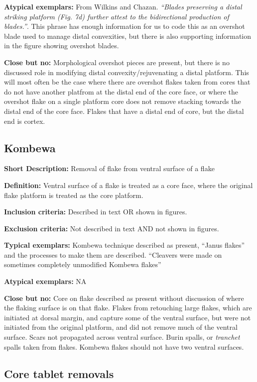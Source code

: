 \documentclass[
]{article}
\begin{document}
\textbf{Atypical exemplars:} From Wilkins and Chazan. \emph{``Blades
preserving a distal striking platform (Fig. 7d) further attest to the
bidirectional production of blades.''}. This phrase has enough
information for us to code this as an overshot blade used to manage
distal convexities, but there is also supporting information in the
figure showing overshot blades.

\textbf{Close but no:} Morphological overshot pieces are present, but
there is no discussed role in modifying distal convexity/rejuvenating a
distal platform. This will most often be the case where there are
overshot flakes taken from cores that do not have another platfrom at
the distal end of the core face, or where the overshot flake on a single
platform core does not remove stacking towards the distal end of the
core face. Flakes that have a distal end of core, but the distal end is
cortex.

\hypertarget{kombewa}{%
\subsection{Kombewa}\label{kombewa}}

\textbf{Short Description:} Removal of flake from ventral surface of a
flake

\textbf{Definition:} Ventral surface of a flake is treated as a core
face, where the original flake platform is treated as the core platform.

\textbf{Inclusion criteria:} Described in text OR shown in figures.

\textbf{Exclusion criteria:} Not described in text AND not shown in
figures.

\textbf{Typical exemplars:} Kombewa technique described as present,
``Janus flakes'' and the processes to make them are described.
``Cleavers were made on sometimes completely unmodified Kombewa flakes''

\textbf{Atypical exemplars:} NA

\textbf{Close but no:} Core on flake described as present without
discussion of where the flaking surface is on that flake. Flakes from
retouching large flakes, which are initiated at dorsal margin, and
capture some of the ventral surface, but were not initiated from the
original platform, and did not remove much of the ventral surface. Scars
not propagated across ventral surface. Burin spalls, or \emph{tranchet}
spalls taken from flakes. Kombewa flakes should not have two ventral
surfaces.

\hypertarget{core-tablet-removals}{%
\subsection{Core tablet removals}\label{core-tablet-removals}}
\end{document}
